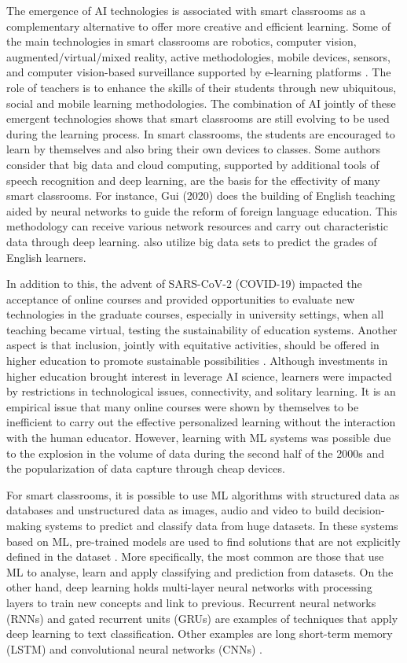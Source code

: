 \documentclass[english]{textolivre}
\begin{document}
The emergence of AI technologies is associated with smart classrooms as
a complementary alternative to offer more creative and efficient
learning. Some of the main technologies in smart classrooms are
robotics, computer vision, augmented/virtual/mixed reality, active
methodologies, mobile devices, sensors, and computer vision-based
surveillance supported by e-learning platforms \cite{Dimitriadou2022}.
The role of teachers is to enhance the skills of their students through
new ubiquitous, social and mobile learning methodologies. The
combination of AI jointly of these emergent technologies shows that
smart classrooms are still evolving to be used during the learning
process. In smart classrooms, the students are encouraged to learn by
themselves and also bring their own devices to classes. Some authors
consider that big data and cloud computing, supported by additional
tools of speech recognition and deep learning, are the basis for the
effectivity of many smart classrooms. For instance, Gui (2020) does the
building of English teaching aided by neural networks to guide the
reform of foreign language education. This methodology can receive
various network resources and carry out characteristic data through deep
learning. \textcite{Li2023} also utilize big data sets to predict
the grades of English learners.

In addition to this, the advent of SARS-CoV-2 (COVID-19) impacted the
acceptance of online courses and provided opportunities to evaluate new
technologies in the graduate courses, especially in university settings,
when all teaching became virtual, testing the sustainability of
education systems. Another aspect is that inclusion, jointly with
equitative activities, should be offered in higher education to promote
sustainable possibilities \cite{Chai2024}. Although investments in
higher education brought interest in leverage AI science, learners were
impacted by restrictions in technological issues, connectivity, and
solitary learning. It is an empirical issue that many online courses
were shown by themselves to be inefficient to carry out the effective
personalized learning without the interaction with the human educator.
However, learning with ML systems was possible due to the explosion in
the volume of data during the second half of the 2000s and the
popularization of data capture through cheap devices.

For smart classrooms, it is possible to use ML algorithms with
structured data as databases and unstructured data as images, audio and
video to build decision-making systems to predict and classify data from
huge datasets. In these systems based on ML, pre-trained models are used
to find solutions that are not explicitly defined in the dataset
\cite{Shaik2022}. More specifically, the most common are those that use
ML to analyse, learn and apply classifying and prediction from datasets.
On the other hand, deep learning holds multi-layer neural networks with
processing layers to train new concepts and link to previous. Recurrent
neural networks (RNNs) and gated recurrent units (GRUs) are examples of
techniques that apply deep learning to text classification. Other
examples are long short-term memory (LSTM) and convolutional neural
networks (CNNs) \cite{Shaik2022}.
\end{document}
